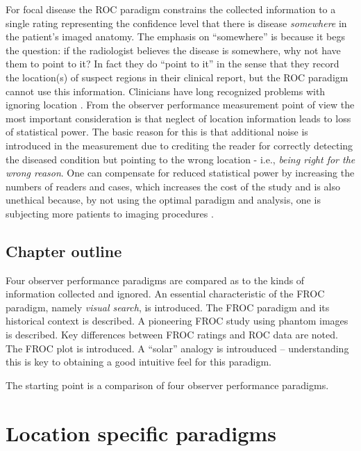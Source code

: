 \documentclass[
]{book}
\begin{document}
For focal disease the ROC paradigm constrains the collected information to a single rating representing the confidence level that there is disease \emph{somewhere} in the patient's imaged anatomy. The emphasis on ``somewhere'' is because it begs the question: if the radiologist believes the disease is somewhere, why not have them to point to it? In fact they do ``point to it'' in the sense that they record the location(s) of suspect regions in their clinical report, but the ROC paradigm cannot use this information. Clinicians have long recognized problems with ignoring location \citep{BlackDwyer1990, RN1921}. From the observer performance measurement point of view the most important consideration is that neglect of location information leads to loss of statistical power. The basic reason for this is that additional noise is introduced in the measurement due to crediting the reader for correctly detecting the diseased condition but pointing to the wrong location - i.e., \emph{being right for the wrong reason}. One can compensate for reduced statistical power by increasing the numbers of readers and cases, which increases the cost of the study and is also unethical because, by not using the optimal paradigm and analysis, one is subjecting more patients to imaging procedures \citep{RN2662}.

\hypertarget{chapter-outline}{%
\subsection{Chapter outline}\label{chapter-outline}}

Four observer performance paradigms are compared as to the kinds of information collected and ignored. An essential characteristic of the FROC paradigm, namely \emph{visual search}, is introduced. The FROC paradigm and its historical context is described. A pioneering FROC study using phantom images is described. Key differences between FROC ratings and ROC data are noted. The FROC plot is introduced. A ``solar'' analogy is introuduced -- understanding this is key to obtaining a good intuitive feel for this paradigm.

The starting point is a comparison of four observer performance paradigms.

\hypertarget{location-specific-paradigms}{%
\section{Location specific paradigms}\label{location-specific-paradigms}}
\end{document}
